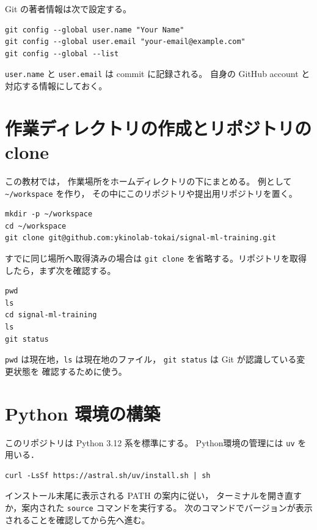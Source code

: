 Git の著者情報は次で設定する。

\begin{lstlisting}[style=codecell]
git config --global user.name "Your Name"
git config --global user.email "your-email@example.com"
git config --global --list
\end{lstlisting}

\texttt{user.name} と \texttt{user.email} は commit に記録される。
自身の GitHub account と対応する情報にしておく。

\section{作業ディレクトリの作成とリポジトリの clone}

この教材では，
作業場所をホームディレクトリの下にまとめる。
例として \texttt{\textasciitilde{}/workspace} を作り，
その中にこのリポジトリや提出用リポジトリを置く。

\begin{lstlisting}[style=codecell]
mkdir -p ~/workspace
cd ~/workspace
git clone git@github.com:ykinolab-tokai/signal-ml-training.git
\end{lstlisting}

すでに同じ場所へ取得済みの場合は \texttt{git clone} を省略する。リポジトリを取得したら，まず次を確認する。

\begin{lstlisting}[style=codecell]
pwd
ls
cd signal-ml-training
ls
git status
\end{lstlisting}

\texttt{pwd} は現在地，\texttt{ls} は現在地のファイル，
\texttt{git status} は Git が認識している変更状態を
確認するために使う。

\section{Python 環境の構築}

このリポジトリは Python 3.12 系を標準にする。
Python環境の管理には \texttt{uv} を用いる．

\begin{lstlisting}[style=codecell]
curl -LsSf https://astral.sh/uv/install.sh | sh
\end{lstlisting}

インストール末尾に表示される PATH の案内に従い，
ターミナルを開き直すか，案内された \texttt{source} コマンドを実行する。
次のコマンドでバージョンが表示されることを確認してから先へ進む。

